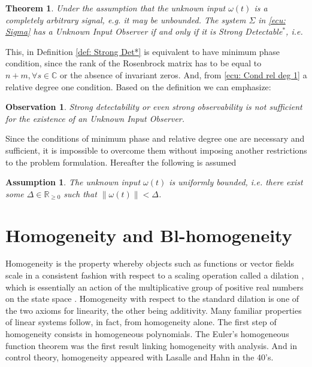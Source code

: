 \documentclass[11pt,letterpaper,twoside,openright]{report}
\newcommand{\RE}{\mathbb{R}}
\providecommand{\norm}[1]{\lVert#1\rVert}
\newtheorem{theorem}{Theorem}[chapter]
\newtheorem{observation}{Observation}[chapter]
\newtheorem{assumtion}{Assumption}[chapter]
\begin{document}
\begin{theorem}
Under the assumption that the unknown input $\omega(t)$ is a completely arbitrary signal, e.g. it may be unbounded. The system $\Sigma$ in \eqref{ecu: Sigma} has a Unknown Input Observer if and only if it is Strong Detectable$^*$, i.e.

\end{theorem}

This, in Definition \ref{def: Strong Det*} is equivalent to have minimum phase condition, since the rank of the Rosenbrock matrix has to be equal to $n + m, \forall s\in \mathbb{C}$ or the absence of invariant zeros. And, from \eqref{ecu: Cond rel deg 1} a relative degree one condition. Based on the definition we can emphasize:

\begin{observation}
	Strong detectability or even strong observability is not sufficient for the existence of an Unknown Input Observer.
\end{observation}

Since the conditions of minimum phase and relative degree one are necessary and sufficient, it is impossible to overcome them without imposing another restrictions to the problem formulation. Hereafter the following is assumed

\begin{assumtion}
	The unknown input $\omega(t)$ is uniformly bounded, i.e. there exist some $\Delta \in \RE_{\geq 0}$ such that $\norm{\omega(t)}<\Delta$.
\end{assumtion}

\section{Homogeneity and Bl-homogeneity}
Homogeneity is the property whereby objects such as functions or vector fields scale in a consistent fashion with respect to a scaling operation called a dilation \cite{Bernuau2014}, which is essentially an action of the multiplicative group of positive real numbers on the state space \cite{Bhat2005}. Homogeneity with respect to the standard dilation is one of the two axioms for linearity, the other being additivity. Many familiar properties of linear systems follow, in fact, from homogeneity alone. The first step of homogeneity consists in homogeneous polynomials. The Euler’s homogeneous function theorem was the first result linking homogeneity with analysis. And in control theory, homogeneity appeared with Lasalle and Hahn in the 40’s. 
\end{document}
